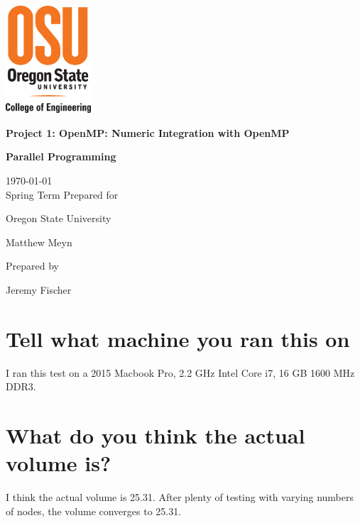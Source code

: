\documentclass[onecolumn,draftclsnofoot, 10pt, compsoc]{IEEEtran}
\def \GroupNumber{		17}
\def \Jeremy{			Jeremy Fischer}
\def \Class{		Parallel Programming}
\def \Assn{		Project 1: OpenMP: Numeric Integration with OpenMP}
\def \School{	Oregon State University}
\def \Professor{		Matthew Meyn}
\begin{document}
\begin{titlepage}
    \begin{singlespace}
    	\includegraphics[height=4cm]{coe.eps}
        \hfill  
        \par\vspace{.2in}
        \centering
        \scshape{
            \vspace{.5in}
            \textbf{\Large\Assn}\par
            \textbf{\large\Class}\par
            \large{
            	\today \\Spring Term
        	}
            \vfill
            {\large Prepared for}\par
            \huge \School\par
            \vspace{5pt}
            {\Large{\Professor}\par}
            {\large Prepared by }\par
            \vspace{5pt}
            {\Large
                {\Jeremy}\par
            }
            \vspace{20pt}
        }

    \end{singlespace}
\end{titlepage}
\newpage
{}

\clearpage


	\section{Tell what machine you ran this on}	
	I ran this test on a 2015 Macbook Pro, 2.2 GHz Intel Core i7, 16 GB 1600 MHz DDR3.
	
	
	\section{What do you think the actual volume is?}
	I think the actual volume is 25.31. After plenty of testing with varying numbers of nodes, the volume converges to 25.31.
	
\end{document}
